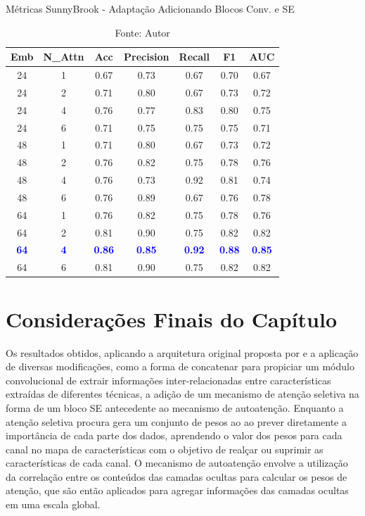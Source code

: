 \begin{table}[htbp]
\centering
\caption{Métricas SunnyBrook - Adaptação Adicionando Blocos Conv. e SE}
\begin{tabular}{ccccccc}
\toprule
\textbf{Emb} & \textbf{N\_Attn} & \textbf{Acc} & \textbf{Precision} & \textbf{Recall} & \textbf{F1} & \textbf{AUC} \\
\midrule
24 & 1 & 0.67 & 0.73 & 0.67 & 0.70 & 0.67 \\
24 & 2 & 0.71 & 0.80 & 0.67 & 0.73 & 0.72 \\
24 & 4 & 0.76 & 0.77 & 0.83 & 0.80 & 0.75 \\
24 & 6 & 0.71 & 0.75 & 0.75 & 0.75 & 0.71 \\
48 & 1 & 0.71 & 0.80 & 0.67 & 0.73 & 0.72 \\
48 & 2 & 0.76 & 0.82 & 0.75 & 0.78 & 0.76 \\
48 & 4 & 0.76 & 0.73 & 0.92 & 0.81 & 0.74 \\
48 & 6 & 0.76 & 0.89 & 0.67 & 0.76 & 0.78 \\
64 & 1 & 0.76 & 0.82 & 0.75 & 0.78 & 0.76 \\
64 & 2 & 0.81 & 0.90 & 0.75 & 0.82 & 0.82 \\
\textcolor{blue}{\textbf{64}} & \textcolor{blue}{\textbf{4}} & \textcolor{blue}{\textbf{0.86}} & \textcolor{blue}{\textbf{0.85}} & \textcolor{blue}{\textbf{0.92}} & \textcolor{blue}{\textbf{0.88}} & \textcolor{blue}{\textbf{0.85}} \\
64 & 6 & 0.81 & 0.90 & 0.75 & 0.82 & 0.82 \\
\bottomrule
\end{tabular}
\caption*{Fonte: Autor}
\label{tab:metrics_sunny_se}
\end{table}

\section{Considerações Finais do Capítulo} 
\label{sec:cap6_consideracoes_finais}

Os resultados obtidos, aplicando a arquitetura original proposta por  e a aplicação de diversas modificações, como a forma de concatenar para propiciar um módulo convolucional de extrair informações inter-relacionadas entre características extraídas de diferentes técnicas, a adição de um mecanismo de atenção seletiva na forma de um bloco \gls{SE} antecedente ao mecanismo de autoatenção. Enquanto a atenção seletiva procura gera um conjunto de pesos ao ao prever diretamente a importância de cada parte dos dados, aprendendo o valor dos pesos para cada canal no mapa de características com o objetivo de realçar ou suprimir as características de cada canal. O mecanismo de autoatenção envolve a utilização da correlação entre os conteúdos das camadas ocultas para calcular os pesos de atenção, que são então aplicados para agregar informações das camadas ocultas em uma escala global. 

